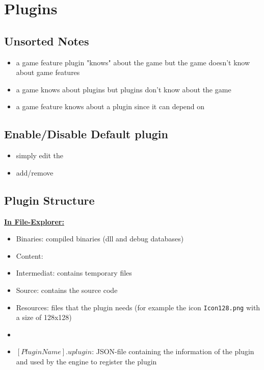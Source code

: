 \chapter{Plugins}

    \section{Unsorted Notes}
        \begin{itemize}
            \item a game feature plugin "knows" about the game but the game doesn't know about game features
            \item a game knows about plugins but plugins don't know about the game
            \item a game feature knows about a plugin since it can depend on
        \end{itemize}

    \section{Enable/Disable Default plugin}
        \begin{itemize}
            \item simply edit the 
            \item add/remove 
        \end{itemize}

    \section{Plugin Structure}
        \uline{\textbf{In File-Explorer:}}
        \begin{itemize}
            \item Binaries: compiled binaries (dll and debug databases)
            \item Content:
            \item Intermediat: contains temporary files
            \item Source: contains the source code
            \item Resources: files that the plugin needs (for example the icon \colorbox{mygray}{\lstinline{Icon128.png}} with a size of 128x128)
            \item 
            \item $[PluginName].uplugin$: JSON-file containing the information of the plugin and used by the engine to register the plugin
        \end{itemize}

